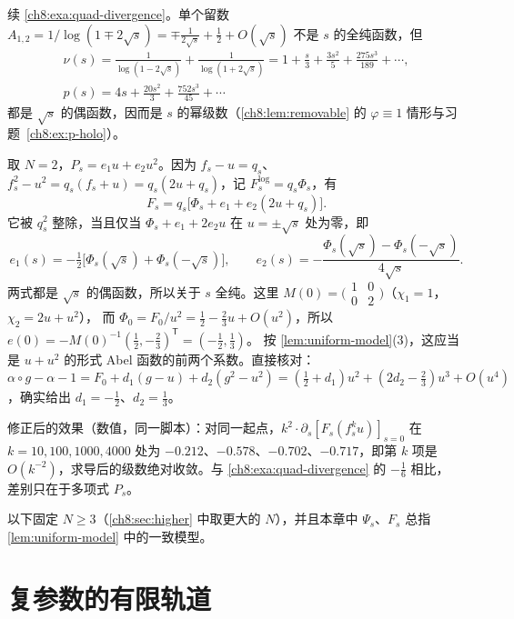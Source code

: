 \begin{example}[二次族的一致模型]\label{ch8:exa:quad-model}
续 \cref{ch8:exa:quad-divergence}。单个留数 $A_{1,2}=1/\log(1\mp2\sqrt s)=\mp\frac1{2\sqrt s}+\frac12+O(\sqrt s)$ 不是 $s$ 的全纯函数，但
\[
\begin{gathered}
 \nu(s)=\frac1{\log(1-2\sqrt s)}+\frac1{\log(1+2\sqrt s)}=1+\frac s3+\frac{3s^2}5+\frac{275s^3}{189}+\cdots,\\
 p(s)=4s+\frac{20s^2}3+\frac{752s^3}{45}+\cdots
\end{gathered}
\]
都是 $\sqrt s$ 的偶函数，因而是 $s$ 的幂级数（\cref{ch8:lem:removable} 的 $\varphi\equiv1$ 情形与习题~\ref{ch8:ex:p-holo}）。

取 $N=2$，$P_s=e_1u+e_2u^2$。因为 $f_s-u=q_s$、$f_s^2-u^2=q_s(f_s+u)=q_s(2u+q_s)$，记 $F^{\log}_s=q_s\Phi_s$，有
\[
 F_s=q_s\bigl[\Phi_s+e_1+e_2(2u+q_s)\bigr].
\]
它被 $q_s^2$ 整除，当且仅当 $\Phi_s+e_1+2e_2u$ 在 $u=\pm\sqrt s$ 处为零，即
\[
 e_1(s)=-\tfrac12\bigl[\Phi_s(\sqrt s)+\Phi_s(-\sqrt s)\bigr],\qquad e_2(s)=-\frac{\Phi_s(\sqrt s)-\Phi_s(-\sqrt s)}{4\sqrt s}.
\]
两式都是 $\sqrt s$ 的偶函数，所以关于 $s$ 全纯。这里 $M(0)=\bigl(\begin{smallmatrix}1&0\\0&2\end{smallmatrix}\bigr)$（$\chi_1=1$，$\chi_2=2u+u^2$），
而 $\Phi_0=F_0/u^2=\frac12-\frac23u+O(u^2)$，所以 $e(0)=-M(0)^{-1}(\frac12,-\frac23)^{\mathsf T}=(-\frac12,\frac13)$。
按 \cref{lem:uniform-model}(3)，这应当是 $u+u^2$ 的形式 Abel 函数的前两个系数。直接核对：
$\alpha\circ g-\alpha-1=F_0+d_1(g-u)+d_2(g^2-u^2)=(\frac12+d_1)u^2+(2d_2-\frac23)u^3+O(u^4)$，确实给出 $d_1=-\frac12$、$d_2=\frac13$。

修正后的效果（数值，同一脚本）：对同一起点，$k^2\cdot\partial_s[F_s(f_s^ku)]_{s=0}$ 在 $k=10,100,1000,4000$ 处为
$-0.212$、$-0.578$、$-0.702$、$-0.717$，即第 $k$ 项是 $O(k^{-2})$，求导后的级数绝对收敛。与 \cref{ch8:exa:quad-divergence} 的 $-\frac16$ 相比，
差别只在于多项式 $P_s$。
\end{example}

以下固定 $N\ge3$（\cref{ch8:sec:higher} 中取更大的 $N$），并且本章中 $\Psi_s$、$F_s$ 总指 \cref{lem:uniform-model} 中的一致模型。

\section{复参数的有限轨道}\label{ch8:sec:finite}


